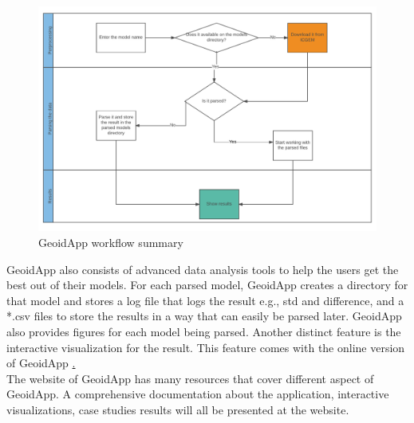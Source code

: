 \begin{figure}[t]
	\caption{GeoidApp workflow summary}
	\label{figure:flowchart}
	\includegraphics[scale=0.5]{Figures/cropped_flow.pdf}
	\centering
\end{figure}

GeoidApp also consists of advanced data analysis tools to help the users get the best out of their models. For each parsed model, GeoidApp creates a directory for that model and stores a log file that logs the result e.g., std and difference, and a *.csv files to store the results in a way that can easily be parsed later. GeoidApp also provides figures for each model being parsed. Another distinct feature is the interactive visualization for the result. This feature comes with the online version of GeoidApp \href{https://geoidapp.github.io}.
\\
The website of GeoidApp has many resources that cover different aspect of GeoidApp. A comprehensive documentation about the application, interactive visualizations, case studies results will all be presented at the website.
 

